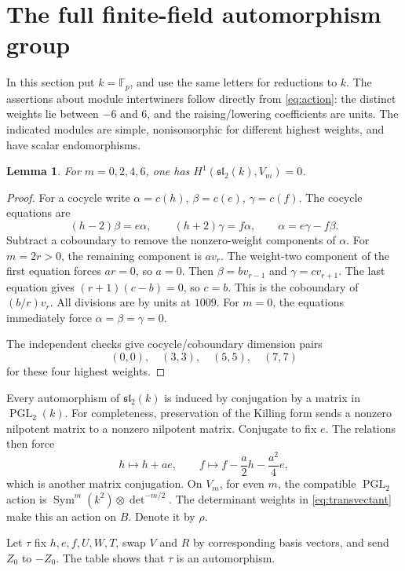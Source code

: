 \documentclass[11pt]{article}
\newtheorem{lemma}[theorem]{Lemma}
\theoremstyle{definition}\newtheorem{definition}[theorem]{Definition}
\theoremstyle{remark}\newtheorem{remark}[theorem]{Remark}
\DeclareMathOperator{\PGL}{PGL}
\newcommand{\Fp}{\mathbb F_p}
\begin{document}
\section{The full finite-field automorphism group}
In this section put $k=\Fp$, and use the same letters for reductions to $k$.
The assertions about module intertwiners follow directly from
\eqref{eq:action}: the distinct weights lie between $-6$ and $6$, and the
raising/lowering coefficients are units. The indicated modules are simple,
nonisomorphic for different highest weights, and have scalar endomorphisms.

\begin{lemma}\label{lem:H1}
For $m=0,2,4,6$, one has $H^1(\mathfrak{sl}_2(k),V_m)=0$.
\end{lemma}
\begin{proof}
For a cocycle write $\alpha=c(h)$, $\beta=c(e)$, $\gamma=c(f)$.
The cocycle equations are
\[
 (h-2)\beta=e\alpha,\qquad (h+2)\gamma=f\alpha,\qquad
 \alpha=e\gamma-f\beta.
\]
Subtract a coboundary to remove the nonzero-weight components of $\alpha$.
For $m=2r>0$, the remaining component is $a v_r$. The weight-two component
of the first equation forces $ar=0$, so $a=0$. Then $\beta=bv_{r-1}$ and
$\gamma=cv_{r+1}$. The last equation gives $(r+1)(c-b)=0$, so $c=b$.
This is the coboundary of $(b/r)v_r$. All divisions are by units at $1009$.
For $m=0$, the equations immediately force $\alpha=\beta=\gamma=0$.

The independent checks give cocycle/coboundary dimension pairs
\[ (0,0),\quad (3,3),\quad (5,5),\quad (7,7) \]
for these four highest weights.
\end{proof}

Every automorphism of $\mathfrak{sl}_2(k)$ is induced by conjugation by a
matrix in $\PGL_2(k)$. For completeness, preservation of the Killing form
sends a nonzero nilpotent matrix to a nonzero nilpotent matrix. Conjugate to
fix $e$. The relations then force
\[
 h\mapsto h+a e,\qquad f\mapsto f-\frac a2h-\frac{a^2}{4}e,
\]
which is another matrix conjugation. On $V_m$, for even $m$, the compatible
$\PGL_2$ action is $\operatorname{Sym}^m(k^2)\otimes\det^{-m/2}$.
The determinant weights in \eqref{eq:transvectant} make this an action on $B$.
Denote it by $\rho$.

Let $\tau$ fix $h,e,f,U,W,T$, swap $V$ and $R$ by corresponding basis
vectors, and send $Z_0$ to $-Z_0$. The table shows that $\tau$ is an
automorphism.
\end{document}
